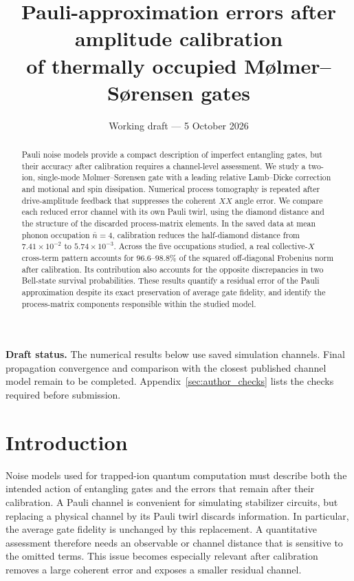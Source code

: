 \documentclass[a4paper,11pt]{article}
\title{Pauli-approximation errors after amplitude calibration\\
of thermally occupied M{\o}lmer--S{\o}rensen gates}
\author{}
\date{Working draft --- 5 October 2026}
\newcommand{\draftnote}[1]{\par\smallskip\noindent
  {\color{blue!55!black}\textbf{Draft status.} #1}\par\smallskip}
\begin{document}
\maketitle
\draftnote{The numerical results below use saved simulation channels.
Final propagation convergence and comparison with the closest published
channel model remain to be completed. Appendix~\ref{sec:author_checks}
lists the checks required before submission.}

\begin{abstract}
Pauli noise models provide a compact description of imperfect entangling
gates, but their accuracy after calibration requires a channel-level
assessment. We study a two-ion, single-mode M{\o}lmer--S{\o}rensen gate
with a leading relative Lamb--Dicke correction and motional and spin
dissipation. Numerical process tomography is repeated after drive-amplitude
feedback that suppresses the coherent $XX$ angle error. We compare each
reduced error channel with its own Pauli twirl, using the diamond distance
and the structure of the discarded process-matrix elements. In the saved
data at mean phonon occupation $\bar n=4$, calibration reduces the
half-diamond distance from $7.41\times10^{-2}$ to $5.74\times10^{-3}$.
Across the five occupations studied, a real collective-$X$ cross-term
pattern accounts for $96.6$--$98.8\%$ of the squared off-diagonal
Frobenius norm after calibration. Its contribution also accounts for the
opposite discrepancies in two Bell-state survival probabilities.
These results quantify a residual error of the Pauli approximation
despite its exact preservation of average gate fidelity, and identify
the process-matrix components responsible within the studied model.
\end{abstract}

\section{Introduction}

Noise models used for trapped-ion quantum computation must describe both
the intended action of entangling gates and the errors that remain after
their calibration. A Pauli channel is convenient for simulating
stabilizer circuits, but replacing a physical channel by its Pauli twirl
discards information. In particular, the average gate fidelity is
unchanged by this replacement. A quantitative assessment therefore needs
an observable or channel distance that is sensitive to the omitted
terms. This issue becomes especially relevant after calibration removes
a large coherent error and exposes a smaller residual channel.
\end{document}
